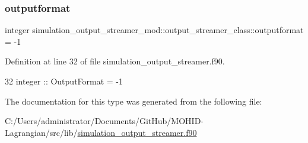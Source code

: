 \subsubsection{\texorpdfstring{outputformat}{outputformat}}
{\footnotesize\ttfamily integer simulation\+\_\+output\+\_\+streamer\+\_\+mod\+::output\+\_\+streamer\+\_\+class\+::outputformat = -\/1\hspace{0.3cm}{\ttfamily [private]}}



Definition at line 32 of file simulation\+\_\+output\+\_\+streamer.\+f90.


\begin{DoxyCode}
32         \textcolor{keywordtype}{integer} :: OutputFormat = -1
\end{DoxyCode}


The documentation for this type was generated from the following file\+:\begin{DoxyCompactItemize}
\item 
C\+:/\+Users/administrator/\+Documents/\+Git\+Hub/\+M\+O\+H\+I\+D-\/\+Lagrangian/src/lib/\mbox{\hyperlink{simulation__output__streamer_8f90}{simulation\+\_\+output\+\_\+streamer.\+f90}}\end{DoxyCompactItemize}
